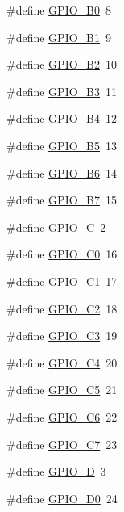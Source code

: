 \begin{DoxyCompactItemize}
\item 
\#define \hyperlink{gpio-1284p_8h_a3de2417f1162f82ecc7b6ea6e0004886}{G\+P\+I\+O\+\_\+\+B0}~8
\item 
\#define \hyperlink{gpio-1284p_8h_a1820cb01509fa403659b3e99b80b27bb}{G\+P\+I\+O\+\_\+\+B1}~9
\item 
\#define \hyperlink{gpio-1284p_8h_ad36aac7f84548354e24c401aa934c7b6}{G\+P\+I\+O\+\_\+\+B2}~10
\item 
\#define \hyperlink{gpio-1284p_8h_a38f9b394c1b451ed5db271cfada2cc56}{G\+P\+I\+O\+\_\+\+B3}~11
\item 
\#define \hyperlink{gpio-1284p_8h_aeba9c8097eb2e801389984afecbb3c90}{G\+P\+I\+O\+\_\+\+B4}~12
\item 
\#define \hyperlink{gpio-1284p_8h_a080b463819841ecb7a85b97abc93973f}{G\+P\+I\+O\+\_\+\+B5}~13
\item 
\#define \hyperlink{gpio-1284p_8h_ae1328b3c83aed73466a2bfcb1d585fc1}{G\+P\+I\+O\+\_\+\+B6}~14
\item 
\#define \hyperlink{gpio-1284p_8h_af74cb0cf2a156f6d29fa0e66765a129b}{G\+P\+I\+O\+\_\+\+B7}~15
\item 
\#define \hyperlink{gpio-1284p_8h_a2f4bc04dde207c6fd5e8caeaa2331f6a}{G\+P\+I\+O\+\_\+C}~2
\item 
\#define \hyperlink{gpio-1284p_8h_a8fd4b5c2107f21d44aa7764470b5a5fa}{G\+P\+I\+O\+\_\+\+C0}~16
\item 
\#define \hyperlink{gpio-1284p_8h_a11c0fc8f2a4435eb6c1b1193916a3c1b}{G\+P\+I\+O\+\_\+\+C1}~17
\item 
\#define \hyperlink{gpio-1284p_8h_adb7cef7e275f79e4a3582a373d6a3e61}{G\+P\+I\+O\+\_\+\+C2}~18
\item 
\#define \hyperlink{gpio-1284p_8h_acb55f364ce36f6c339f9fd992306ad2f}{G\+P\+I\+O\+\_\+\+C3}~19
\item 
\#define \hyperlink{gpio-1284p_8h_a45e2a048e637054efe1298658c804577}{G\+P\+I\+O\+\_\+\+C4}~20
\item 
\#define \hyperlink{gpio-1284p_8h_adf125411da7640420817e192de2a92c8}{G\+P\+I\+O\+\_\+\+C5}~21
\item 
\#define \hyperlink{gpio-1284p_8h_ac58e93f1384b99117055b38250677685}{G\+P\+I\+O\+\_\+\+C6}~22
\item 
\#define \hyperlink{gpio-1284p_8h_a9ed5ca1a49ddd458564feb79748cda4d}{G\+P\+I\+O\+\_\+\+C7}~23
\item 
\#define \hyperlink{gpio-1284p_8h_a934cdd70e18bffe0417b3cd938b266a9}{G\+P\+I\+O\+\_\+D}~3
\item 
\#define \hyperlink{gpio-1284p_8h_af9b6f0cba5ba69f280219ebb735a487a}{G\+P\+I\+O\+\_\+\+D0}~24

\end{DoxyCompactItemize}
